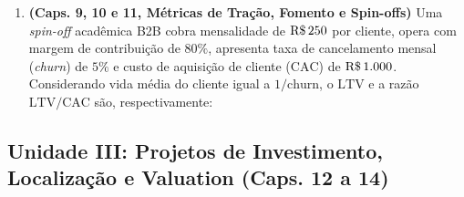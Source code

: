 \begin{enumerate}[leftmargin=1.5em, itemsep=5pt, resume]
  \item \textbf{(Caps. 9, 10 e 11, Métricas de Tração, Fomento e Spin-offs)} Uma \textit{spin-off} acadêmica B2B cobra mensalidade de $\text{R\$\,}{250}$ por cliente, opera com margem de contribuição de $80\%$, apresenta taxa de cancelamento mensal (\textit{churn}) de $5\%$ e custo de aquisição de cliente ($\text{CAC}$) de $\text{R\$\,}{1.000}$. Considerando vida média do cliente igual a $1/\text{churn}$, o $\text{LTV}$ e a razão $\text{LTV/CAC}$ são, respectivamente:
\end{enumerate}

\subsection*{Unidade III: Projetos de Investimento, Localização e Valuation (Caps. 12 a 14)}

